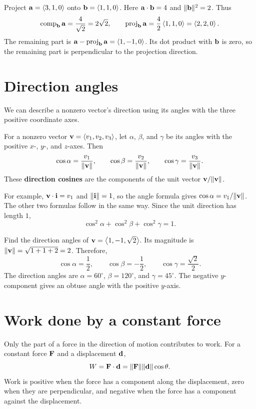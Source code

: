 \documentclass[11pt]{article}
\begin{document}
\begin{example}{Project $\mathbf{a}=\left\langle 3,1,0\right\rangle$ onto $\mathbf{b}=\left\langle 1,1,0\right\rangle$.}
Here $\mathbf{a}\cdot\mathbf{b}=4$ and $\lVert\mathbf{b}\rVert^2=2$. Thus
\[
 \operatorname{comp}_{\mathbf{b}}\mathbf{a}=\frac4{\sqrt{2}}=2\sqrt{2},
 \qquad
 \operatorname{proj}_{\mathbf{b}}\mathbf{a}=\frac42\left\langle 1,1,0\right\rangle=\left\langle 2,2,0\right\rangle.
\]
The remaining part is $\mathbf{a}-\operatorname{proj}_{\mathbf{b}}\mathbf{a}=\left\langle 1,-1,0\right\rangle$.
Its dot product with $\mathbf{b}$ is zero, so the remaining part is perpendicular
to the projection direction.
\end{example}

\newpage
\section{Direction angles}
We can describe a nonzero vector's direction using its angles with the
three positive coordinate axes.

\begin{definition}
For a nonzero vector $\mathbf{v}=\left\langle v_1,v_2,v_3\right\rangle$, let $\alpha$, $\beta$, and
$\gamma$ be its angles with the positive $x$-, $y$-, and $z$-axes. Then
\[
 \cos\alpha=\frac{v_1}{\lVert\mathbf{v}\rVert},\qquad
 \cos\beta=\frac{v_2}{\lVert\mathbf{v}\rVert},\qquad
 \cos\gamma=\frac{v_3}{\lVert\mathbf{v}\rVert}.
\]
These \textbf{direction cosines} are the components of the unit vector
$\mathbf{v}/\lVert\mathbf{v}\rVert$.
\end{definition}

For example, $\mathbf{v}\cdot\mathbf{i}=v_1$ and $\lVert\mathbf{i}\rVert=1$, so the angle
formula gives $\cos\alpha=v_1/\lVert\mathbf{v}\rVert$. The other two formulas
follow in the same way. Since the unit direction has length $1$,
\[
 \cos^2\alpha+\cos^2\beta+\cos^2\gamma=1.
\]

\begin{example}{Find the direction angles of $\mathbf{v}=\left\langle 1,-1,\sqrt{2}\right\rangle$.}
Its magnitude is $\lVert\mathbf{v}\rVert=\sqrt{1+1+2}=2$. Therefore,
\[
 \cos\alpha=\frac12,\qquad
 \cos\beta=-\frac12,\qquad
 \cos\gamma=\frac{\sqrt{2}}2.
\]
The direction angles are $\alpha=60^\circ$, $\beta=120^\circ$, and
$\gamma=45^\circ$. The negative $y$-component gives an obtuse angle
with the positive $y$-axis.
\end{example}

\section{Work done by a constant force}
Only the part of a force in the direction of motion contributes to work.
For a constant force $\mathbf{F}$ and a displacement $\mathbf{d}$,
\[
 W=\mathbf{F}\cdot\mathbf{d}
  =\lVert\mathbf{F}\rVert\lVert\mathbf{d}\rVert\cos\theta.
\]
Work is positive when the force has a component along the displacement,
zero when they are perpendicular, and negative when the force has a
component against the displacement.
\end{document}
